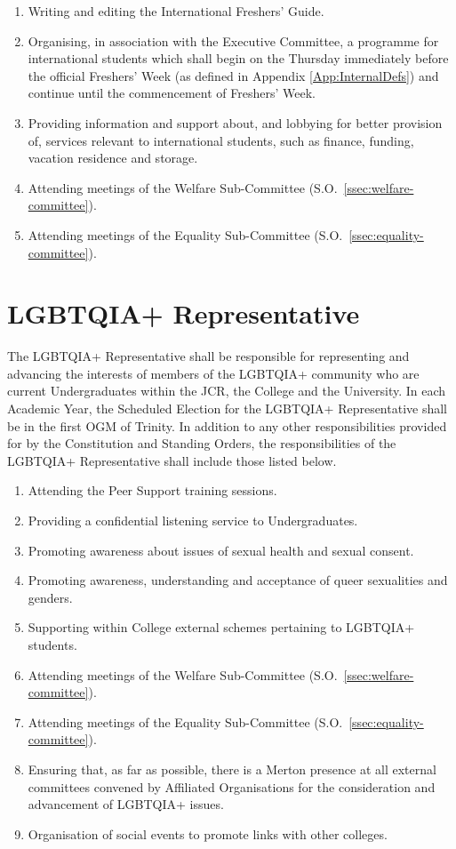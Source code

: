 \begin{enumerate}
\begin{enumerate}
        \item In conjunction with the Welfare Officers, hold at least one event early in Michaelmas Term at which international students can meet and get to know one another, held separately from the JCR parenting scheme.
    \end{enumerate}
	\item Writing and editing the International Freshers' Guide.
	\item Organising, in association with the Executive Committee, a programme for international students which shall begin on the Thursday immediately before the official Freshers’ Week (as defined in Appendix \ref{App:InternalDefs}) and continue until the commencement of Freshers’ Week. 
	\item Providing information and support about, and lobbying for better provision of, services relevant to international students, such as finance, funding, vacation residence and storage.
	\item Attending meetings of the Welfare Sub-Committee (S.O.~\ref{ssec:welfare-committee}).
	\item Attending meetings of the Equality Sub-Committee (S.O.~\ref{ssec:equality-committee}).
\end{enumerate}
\section{LGBTQIA+ Representative}
\npara The LGBTQIA+ Representative shall be responsible for representing and advancing the interests of members of the LGBTQIA+ community who are current Undergraduates within the JCR, the College and the University.
\npara In each Academic Year, the Scheduled Election for the LGBTQIA+ Representative shall be in the first OGM of Trinity.
\npara In addition to any other responsibilities provided for by the Constitution and Standing Orders, the responsibilities of the LGBTQIA+ Representative shall include those listed below.
\begin{enumerate}
	\item Attending the Peer Support training sessions.
	\item Providing a confidential listening service to Undergraduates.
	\item Promoting awareness about issues of sexual health and sexual consent.
	\item Promoting awareness, understanding and acceptance of queer sexualities and genders.
	\item Supporting within College external schemes pertaining to LGBTQIA+ students.
	\item Attending meetings of the Welfare Sub-Committee (S.O.~\ref{ssec:welfare-committee}).
	\item Attending meetings of the Equality Sub-Committee (S.O.~\ref{ssec:equality-committee}).
	\item Ensuring that, as far as possible, there is a Merton presence at all external committees convened by Affiliated Organisations for the consideration and advancement of LGBTQIA+ issues.
	\item Organisation of social events to promote links with other colleges.
\end{enumerate}
